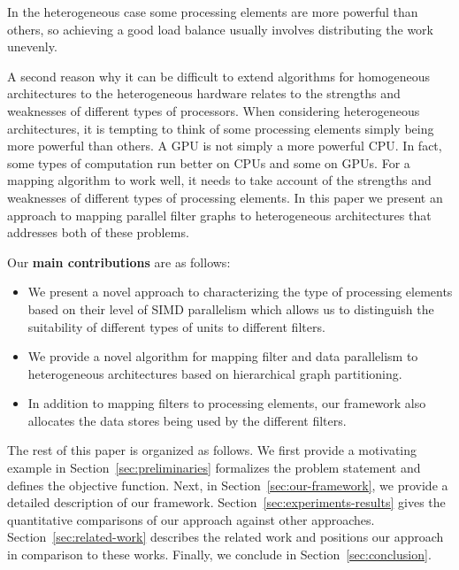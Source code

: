 In the heterogeneous case some processing elements are more powerful
than others, so achieving a good load balance usually involves
distributing the work unevenly. %

A second reason why it can be difficult to extend algorithms for
homogeneous architectures to the heterogeneous hardware relates to the
strengths and weaknesses of different types of processors. When
considering heterogeneous architectures, it is tempting to think of
some processing elements simply being more powerful than others. %
A GPU is not simply a more powerful CPU. In fact, some types of
computation run better on CPUs and some on GPUs.  For a mapping
algorithm to work well, it needs to take account of the strengths and
weaknesses of different types of processing elements. In this paper we present
an approach to mapping parallel filter graphs to
heterogeneous architectures that addresses both of these problems.

Our \textbf{main contributions} are as follows:
\begin{itemize}
\item We present a novel approach to characterizing the type of
  processing elements based on their level of SIMD parallelism which
  allows us to distinguish the suitability of different types of units
  to different filters.
\item We provide a novel algorithm for mapping filter and data parallelism
  to heterogeneous architectures based on hierarchical graph
  partitioning.
\item In addition to mapping filters to processing elements, our framework
  also allocates the data stores being used by the different filters.
\end{itemize}

The rest of this paper is organized as follows. We first provide a
motivating example in
Section~\ref{sec:preliminaries} formalizes the problem statement and
defines the objective function. Next, in
Section~\ref{sec:our-framework}, we provide a detailed description of
our framework. %
Section~\ref{sec:experiments-results} gives the quantitative
comparisons of our approach against other
approaches. Section~\ref{sec:related-work} describes the related work
and positions our approach in comparison to these works.  Finally, we
conclude in Section~\ref{sec:conclusion}.


